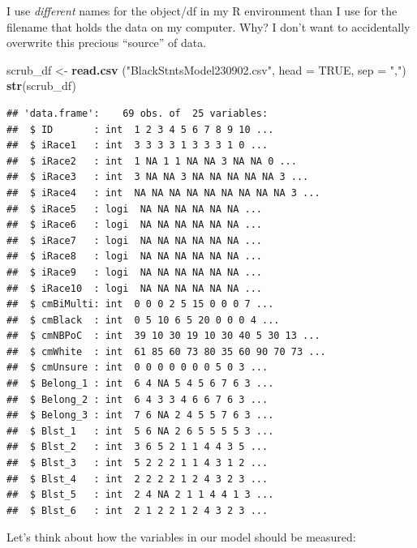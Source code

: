 \documentclass[
  11pt,
]{book}
\newenvironment{Shaded}{\begin{snugshade}}{\end{snugshade}}
\newcommand{\AttributeTok}[1]{\textcolor[rgb]{0.27,0.27,0.27}{#1}}
\newcommand{\ConstantTok}[1]{\textcolor[rgb]{0.37,0.37,0.37}{#1}}
\newcommand{\FunctionTok}[1]{\textcolor[rgb]{0.27,0.27,0.27}{\textbf{#1}}}
\newcommand{\NormalTok}[1]{#1}
\newcommand{\OtherTok}[1]{\textcolor[rgb]{0.37,0.37,0.37}{#1}}
\newcommand{\StringTok}[1]{\textcolor[rgb]{0.5,0.5,0.5}{#1}}
\begin{document}
I use \emph{different} names for the object/df in my R environment than I use for the filename that holds the data on my computer. Why? I don't want to accidentally overwrite this precious ``source'' of data.

\begin{Shaded}
\begin{Highlighting}[]
\NormalTok{scrub\_df }\OtherTok{\textless{}{-}} \FunctionTok{read.csv}\NormalTok{ (}\StringTok{"BlackStntsModel230902.csv"}\NormalTok{, }\AttributeTok{head =} \ConstantTok{TRUE}\NormalTok{, }\AttributeTok{sep =} \StringTok{","}\NormalTok{)}
\FunctionTok{str}\NormalTok{(scrub\_df)}
\end{Highlighting}
\end{Shaded}

\begin{verbatim}
## 'data.frame':    69 obs. of  25 variables:
##  $ ID       : int  1 2 3 4 5 6 7 8 9 10 ...
##  $ iRace1   : int  3 3 3 3 1 3 3 3 1 0 ...
##  $ iRace2   : int  1 NA 1 1 NA NA 3 NA NA 0 ...
##  $ iRace3   : int  3 NA NA 3 NA NA NA NA NA 3 ...
##  $ iRace4   : int  NA NA NA NA NA NA NA NA NA 3 ...
##  $ iRace5   : logi  NA NA NA NA NA NA ...
##  $ iRace6   : logi  NA NA NA NA NA NA ...
##  $ iRace7   : logi  NA NA NA NA NA NA ...
##  $ iRace8   : logi  NA NA NA NA NA NA ...
##  $ iRace9   : logi  NA NA NA NA NA NA ...
##  $ iRace10  : logi  NA NA NA NA NA NA ...
##  $ cmBiMulti: int  0 0 0 2 5 15 0 0 0 7 ...
##  $ cmBlack  : int  0 5 10 6 5 20 0 0 0 4 ...
##  $ cmNBPoC  : int  39 10 30 19 10 30 40 5 30 13 ...
##  $ cmWhite  : int  61 85 60 73 80 35 60 90 70 73 ...
##  $ cmUnsure : int  0 0 0 0 0 0 0 5 0 3 ...
##  $ Belong_1 : int  6 4 NA 5 4 5 6 7 6 3 ...
##  $ Belong_2 : int  6 4 3 3 4 6 6 7 6 3 ...
##  $ Belong_3 : int  7 6 NA 2 4 5 5 7 6 3 ...
##  $ Blst_1   : int  5 6 NA 2 6 5 5 5 5 3 ...
##  $ Blst_2   : int  3 6 5 2 1 1 4 4 3 5 ...
##  $ Blst_3   : int  5 2 2 2 1 1 4 3 1 2 ...
##  $ Blst_4   : int  2 2 2 2 1 2 4 3 2 3 ...
##  $ Blst_5   : int  2 4 NA 2 1 1 4 4 1 3 ...
##  $ Blst_6   : int  2 1 2 2 1 2 4 3 2 3 ...
\end{verbatim}

Let's think about how the variables in our model should be measured:
\end{document}
